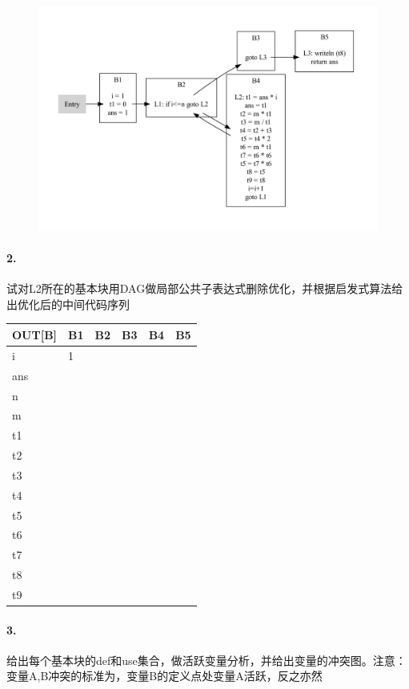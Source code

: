\documentclass[UTF8]{ctexart} %
\begin{document}
\begin{figure}[H]
    \centering
    \includegraphics[width=\textwidth]{assets/control-flow.pdf}
\end{figure}

\paragraph{2.} 试对L2所在的基本块用DAG做局部公共子表达式删除优化，并根据启发式算法给出优化后的中间代码序列

\begin{table}[H]
    \centering
    \begin{tabular}{|p{2cm}<{\centering}|p{1cm}<{\centering}|p{1cm}<{\centering}|p{1cm}<{\centering}|p{1cm}<{\centering}|p{1cm}<{\centering}|}
        \hline
        OUT[B] & B1 & B2 & B3 & B4 & B5 \\
        \hline
        i      & 1  &    &    &    &    \\
        \hline
        ans    &    &    &    &    &    \\
        \hline
        n      &    &    &    &    &    \\
        \hline
        m      &    &    &    &    &    \\
        \hline
        t1     &    &    &    &    &    \\
        \hline
        t2     &    &    &    &    &    \\
        \hline
        t3     &    &    &    &    &    \\
        \hline
        t4     &    &    &    &    &    \\
        \hline
        t5     &    &    &    &    &    \\
        \hline
        t6     &    &    &    &    &    \\
        \hline
        t7     &    &    &    &    &    \\
        \hline
        t8     &    &    &    &    &    \\
        \hline
        t9     &    &    &    &    &    \\
        \hline
    \end{tabular}
\end{table}

\paragraph{3.} 给出每个基本块的def和use集合，做活跃变量分析，并给出变量的冲突图。注意：变量A,B冲突的标准为，变量B的定义点处变量A活跃，反之亦然
\end{document}
